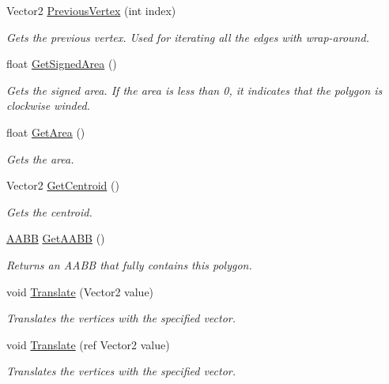 \begin{DoxyCompactItemize}
Vector2 \hyperlink{class_farseer_physics_1_1_common_1_1_vertices_aabf2444d2ed5ffcc364a5886d8f51cbb}{Previous\+Vertex} (int index)
\begin{DoxyCompactList}\small\item\em Gets the previous vertex. Used for iterating all the edges with wrap-\/around. \end{DoxyCompactList}\item 
float \hyperlink{class_farseer_physics_1_1_common_1_1_vertices_a261502c59c5edf613768d6889ea2162d}{Get\+Signed\+Area} ()
\begin{DoxyCompactList}\small\item\em Gets the signed area. If the area is less than 0, it indicates that the polygon is clockwise winded. \end{DoxyCompactList}\item 
float \hyperlink{class_farseer_physics_1_1_common_1_1_vertices_a8ad6dd84be8e1478ef46928dc2e1e29f}{Get\+Area} ()
\begin{DoxyCompactList}\small\item\em Gets the area. \end{DoxyCompactList}\item 
Vector2 \hyperlink{class_farseer_physics_1_1_common_1_1_vertices_aa0374100393ab07badfea061da67e994}{Get\+Centroid} ()
\begin{DoxyCompactList}\small\item\em Gets the centroid. \end{DoxyCompactList}\item 
\hyperlink{struct_farseer_physics_1_1_collision_1_1_a_a_b_b}{A\+A\+B\+B} \hyperlink{class_farseer_physics_1_1_common_1_1_vertices_abc4e3f20dec6ada1ee7a2b4c3a4471f7}{Get\+A\+A\+B\+B} ()
\begin{DoxyCompactList}\small\item\em Returns an A\+A\+B\+B that fully contains this polygon. \end{DoxyCompactList}\item 
void \hyperlink{class_farseer_physics_1_1_common_1_1_vertices_a378a0a8cd771dc805aea70f323df2aa5}{Translate} (Vector2 value)
\begin{DoxyCompactList}\small\item\em Translates the vertices with the specified vector. \end{DoxyCompactList}\item 
void \hyperlink{class_farseer_physics_1_1_common_1_1_vertices_a76202d93e9779629a55daf695787e936}{Translate} (ref Vector2 value)
\begin{DoxyCompactList}\small\item\em Translates the vertices with the specified vector. \end{DoxyCompactList}\item 

\end{DoxyCompactItemize}

